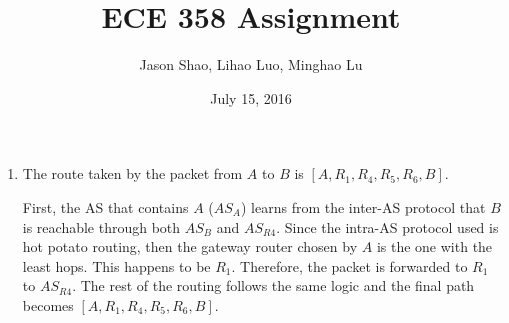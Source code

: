 \documentclass[12pt]{article}
\title{ECE 358 Assignment }
\author{Jason Shao, Lihao Luo, Minghao Lu}
\date{July 15, 2016}
\begin{document}
\maketitle
\renewcommand{\thesubsection}{Problem \arabic{subsection}}


\def\question#1{\item[\bf #1.]}
\def\part#1{\item[\bf #1)]}
\newcommand{\pc}[1]{\mbox{\textbf{#1}}} %

\begin{enumerate}
\item The route taken by the packet from $A$ to $B$ is $[A, R_1, R_4, R_5, R_6, B]$. 

First, the AS that contains $A$ ($AS_A$) learns from the inter-AS protocol that $B$ is reachable through both $AS_B$ and $AS_{R4}$. Since the intra-AS protocol used is hot potato routing, then the gateway router chosen by $A$ is the one with the least hops. This happens to be $R_1$. Therefore, the packet is forwarded to $R_1$ to $AS_{R4}$. The rest of the routing follows the same logic and the final path becomes $[A, R_1, R_4, R_5, R_6, B]$.

\end{enumerate}
\end{document}
